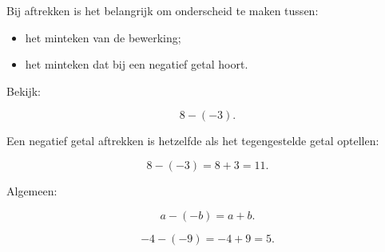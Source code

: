 \documentclass{ximera}
\begin{document}


Bij aftrekken is het belangrijk om onderscheid te maken tussen:

\begin{itemize}
    \item het minteken van de bewerking;
    \item het minteken dat bij een negatief getal hoort.
\end{itemize}

Bekijk:

\[
8-(-3).
\]

Een negatief getal aftrekken is hetzelfde als het tegengestelde getal
optellen:

\[
8-(-3)=8+3=11.
\]

Algemeen:

\[
a-(-b)=a+b.
\]


\begin{voorbeeld}

\[
-4-(-9)
=
-4+9
=
5.
\]

\end{voorbeeld}
\end{document}
